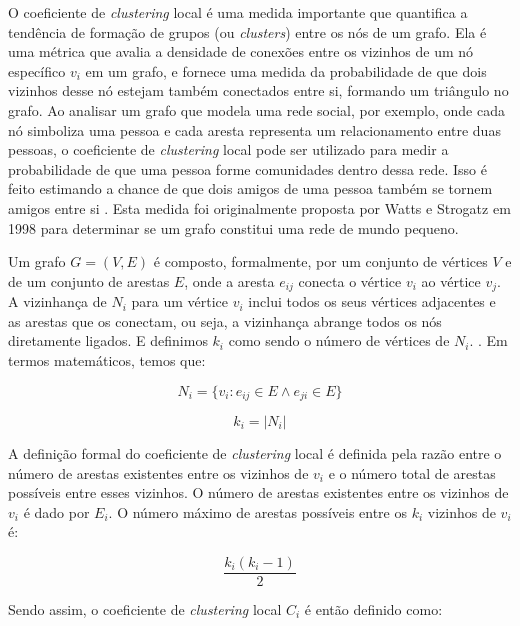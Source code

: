 O coeficiente de \textit{clustering} local é uma medida importante que quantifica a tendência de
formação de grupos (ou \textit{clusters}) entre os nós de um grafo. Ela é uma métrica que avalia a
densidade de conexões entre os vizinhos de um nó específico $v_i$ em um grafo, e fornece uma
medida da probabilidade de que dois vizinhos desse nó estejam também conectados entre si,
formando um triângulo no grafo. Ao analisar um grafo que modela uma rede social, por
exemplo, onde cada nó simboliza uma pessoa e cada aresta representa um relacionamento
entre duas pessoas, o coeficiente de \textit{clustering} local pode ser utilizado para medir a
probabilidade de que uma pessoa forme comunidades dentro dessa rede. Isso é feito estimando
a chance de que dois amigos de uma pessoa também se tornem amigos entre si \cite[11]{Lima2022}. Esta
medida foi originalmente proposta por Watts e Strogatz em 1998 para determinar se um grafo
constitui uma rede de mundo pequeno.

Um grafo $G = (V, E)$ é composto, formalmente, por um conjunto de vértices $V$ e de um
conjunto de arestas $E$, onde a aresta $e_{ij}$ conecta o vértice $v_i$ ao vértice $v_j$. A vizinhança de $N_i$
para um vértice $v_i$ inclui todos os seus vértices adjacentes e as arestas que os conectam, ou
seja, a vizinhança abrange todos os nós diretamente ligados. E definimos $k_i$ como sendo o
número de vértices de $N_i$. \cite[23--24]{Easley2010}. Em termos matemáticos, temos que:

\begin{equation}
    N_i = \{ v_i : e_{ij} \in E \land e_{ji} \in E\}
\end{equation}

\begin{equation}
    k_i = |N_i|
\end{equation}

A definição formal do coeficiente de \textit{clustering} local é definida pela razão entre o número de arestas existentes entre os vizinhos de $v_i$ e o número total de arestas possíveis entre esses
vizinhos. O número de arestas existentes entre os vizinhos de $v_i$ é dado por $E_i$. O número
máximo de arestas possíveis entre os $k_i$ vizinhos de $v_i$ é:

\begin{equation}
    \frac{k_i(k_i-1)}{2}
\end{equation}

Sendo assim, o coeficiente de \textit{clustering} local $C_i$ é então definido como:

